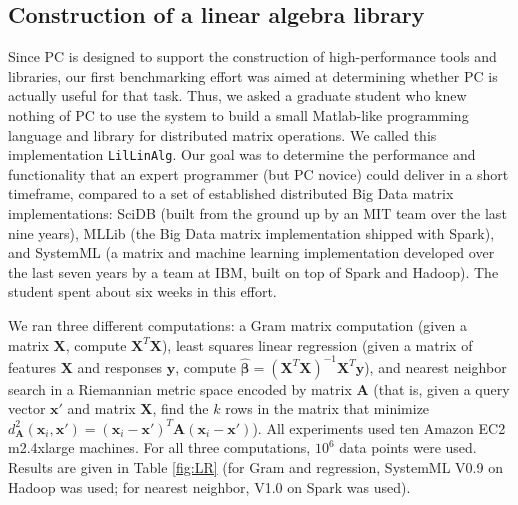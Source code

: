 \subsection {Construction of a linear algebra library}
Since PC is designed to support the construction
of high-performance tools and libraries, our first benchmarking effort was aimed at determining 
whether PC is actually useful for that task.  Thus, we asked
a graduate student who knew nothing of PC to use the system to build a small Matlab-like 
programming language and library for distributed matrix operations.
We called this implementation \texttt{LilLinAlg}.
Our goal was to determine the 
performance and functionality that an expert programmer (but PC novice) could deliver in a short
timeframe, compared to a set of established distributed Big Data matrix implementations:
SciDB \cite{brown2010overview, stonebraker2011architecture} (built from the ground up by an MIT team over the last nine years), MLLib \cite{meng2016mllib} 
(the Big Data matrix
implementation shipped with Spark), and SystemML \cite{boehm2014hybrid, ghoting2011systemml, boehm2016systemml}
(a matrix and machine learning implementation developed
over the last seven years by a team at IBM, built on top of Spark and Hadoop).
The student spent about six weeks in this effort.

We ran three different computations:
a Gram matrix computation (given a matrix $\textbf{X}$, compute
$\textbf{X}^T \textbf{X}$), least squares linear regression (given a matrix of features $\textbf{X}$ and
responses $\textbf{y}$, compute 
$\hat{\pmb{\beta}} = (\textbf{X}^{T} \textbf{X})^{-1} \textbf{X}^{T} \textbf{y}$), and nearest
neighbor search in a Riemannian metric space \cite{lebanon2006metric} encoded by matrix $\textbf{A}$ (that is,
given a query vector
$\textbf{x}'$ and matrix $\textbf{X}$, find the $k$ rows in the matrix that minimize 
$d_{\textbf{A}}^2(\textbf{x}_i, \textbf{x}') = 
(\textbf{x}_i - \textbf{x}')^T\textbf{A}(\textbf{x}_i - \textbf{x}')$).  All experiments used
ten Amazon
EC2 m2.4xlarge machines.  For
all three computations, 
$10^6$ data points were used.  Results are given in 
Table \ref{fig:LR} (for Gram and regression, SystemML V0.9 on Hadoop was used; for
nearest neighbor, V1.0 on Spark was used).



